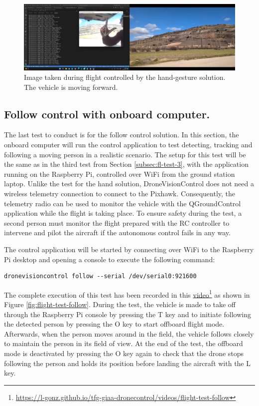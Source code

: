 \begin{figure}[H]
  \centering
  \includegraphics[width=\textwidth, keepaspectratio]{img/video-field-test-hand.png}
  \caption{Image taken during flight controlled by the hand-gesture solution. The vehicle is moving forward.}
  \label{fig:flight-test-hand}
\end{figure}


\subsection{Follow control with onboard computer.}
\label{subsec:fl-test-5}

The last test to conduct is for the follow control solution. In this section, the onboard computer will run the control application to test detecting, tracking and following a moving person in a realistic scenario. The setup for this test will be the same as in the third test from Section \ref{subsec:fl-test-3}, with the application running on the Raspberry Pi, controlled over WiFi from the ground station laptop. Unlike the test for the hand solution, DroneVisionControl does not need a wireless telemetry connection to connect to the Pixhawk. Consequently, the telemetry radio can be used to monitor the vehicle with the QGroundControl application while the flight is taking place. To ensure safety during the test, a second person must monitor the flight prepared with the RC controller to intervene and pilot the aircraft if the autonomous control fails in any way.


The control application will be started by connecting over WiFi to the Raspberry Pi desktop and opening a console to execute the following command:
\begin{verbatim}
dronevisioncontrol follow --serial /dev/serial0:921600
\end{verbatim}


The complete execution of this test has been recorded in this \href{https://l-gonz.github.io/tfg-giaa-dronecontrol/videos/flight-test-follow}{video}\footnote{\url{https://l-gonz.github.io/tfg-giaa-dronecontrol/videos/flight-test-follow}} as shown in Figure \ref{fig:flight-test-follow}. During the test, the vehicle is made to take off through the Raspberry Pi console by pressing the T key and to initiate following the detected person by pressing the O key to start offboard flight mode. Afterwards, when the person moves around in the field, the vehicle follows closely to maintain the person in its field of view. At the end of the test, the offboard mode is deactivated by pressing the O key again to check that the drone stops following the person and holds its position before landing the aircraft with the L key.

